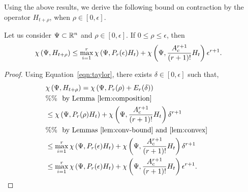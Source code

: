 Using the above results, we derive the following bound on contraction
by the operator $H_{t+\rho}$, when $\rho\in[0,\epsilon]$.
%
\begin{lemma}\label{lem:conv}
Let us consider $\Psi\subset\mathbb{R}^n$ and $\rho\in[0,\epsilon]$.  If
$0\leq \rho\leq \epsilon$, then
%
\begin{align*}
& \chi\left(\Psi,H_{t+\rho}\right)\leq\max_{i=1}^r\chi\left(\Psi,P_r(\epsilon)H_t\right)+\chi\left(\Psi,\frac{A_c^{r+1}}{(r+1)!}H_t\right)\epsilon^{r+1}.
\end{align*}
%
\end{lemma}
%
\begin{proof}
Using Equation~\ref{eqn:taylor}, there exists
$\delta\in[0,\epsilon]$ such that,
%
\begin{align*}
&
  \chi\left(\Psi,H_{t+\rho}\right)=\chi\left(\Psi,P_r(\rho)+E_r(\delta)\right)\\
& \%\%~~\text{by Lemma~\ref{lem:composition}}\\
&
  \leq\chi\left(\Psi,P_r(\rho)H_t\right)+\chi\left(\Psi,\frac{A_c^{r+1}}{(r+1)!}H_t\right)\delta^{r+1}\\
  & \%\%~~\text{by Lemmas~\ref{lem:conv-bound} and~\ref{lem:convex}}\\
&
  \leq\max_{i=1}^r\chi\left(\Psi,P_r(\epsilon)H_t\right)+\chi\left(\Psi,\frac{A_c^{r+1}}{(r+1)!}H_t\right)\delta^{r+1}\\
& \leq\max_{i=1}^r\chi\left(\Psi,P_r(\epsilon)H_t\right)+\chi\left(\Psi,\frac{A_c^{r+1}}{(r+1)!}H_t\right)\epsilon^{r+1}.\hspace{3em}\qedhere
\end{align*}
%
\end{proof}
%

